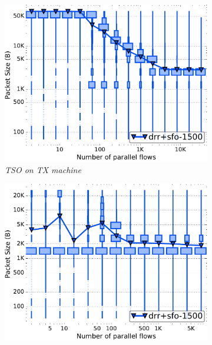 \begin{figure}[t]
\begin{minipage}[t]{0.48\textwidth}
\begin{subfigure}[t]{.49\linewidth}
            \label{fig:quanta-cpu-bw}
    \end{subfigure}
        \vspace{-2mm}
    	\caption{\small{
        \textit{Trade-offs in DRR's quantum configuration. }
		}}
	\label{fig:packets}
  \end{minipage}
        \begin{minipage}[t]{0.48\textwidth}
	\centering
	\begin{subfigure}[t]{.49\linewidth}
		\centering\includegraphics[width=1\linewidth]{figs/paral_cn_1t16x1024_gso_pkthist_fq_drr_1500.pdf}
  \vspace{-6mm}
		\caption{\small{\textit{TSO on TX machine}}}
            \label{fig:packets-edge}
	\end{subfigure}
	\begin{subfigure}[t]{.49\linewidth}
		\centering\includegraphics[width=1\linewidth]{figs/paral_cn_1t4x1024_gro_pkthist_fq_drr_1500.pdf}

\end{subfigure}
\end{minipage}
\end{figure}
